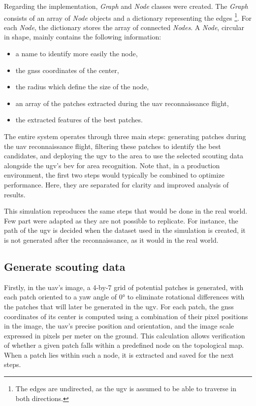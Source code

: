 Regarding the implementation, \textit{Graph} and \textit{Node} classes were created.
The \textit{Graph} consists of an array of \textit{Node} objects and a dictionary representing the edges
\footnote{The edges are undirected, as the \gls{ugv} is assumed to be able to traverse in both directions.}.
For each \textit{Node}, the dictionary stores the array of connected \textit{Nodes}.
A \textit{Node}, circular in shape, mainly contains the following information:
\begin{itemize}
    \item a name to identify more easily the node,
    \item the \gls{gnss} coordinates of the center,
    \item the radius which define the size of the node,
    \item an array of the patches extracted during the \gls{uav} reconnaissance flight,
    \item the extracted features of the best patches.
\end{itemize}

The entire system operates through three main steps: generating patches during the \gls{uav} reconnaissance flight,
filtering these patches to identify the best candidates, and deploying the \gls{ugv} to the area to use the selected
scouting data alongside the \gls{ugv}'s \gls{bev} for area recognition.
Note that, in a production environment, the first two steps would typically be combined to optimize performance.
Here, they are separated for clarity and improved analysis of results.

This simulation reproduces the same steps that would be done in the real world.
Few part were adapted as they are not possible to replicate.
For instance, the path of the \gls{ugv} is decided when the dataset used in the simulation is created, it is not generated
after the reconnaissance, as it would in the real world.

\subsection{Generate scouting data}\label{subsec:generate-scouting-data}

Firstly, in the \gls{uav}'s image, a 4-by-7 grid of potential patches is generated, with each patch oriented to a
yaw angle of 0° to eliminate rotational differences with the patches that will later be generated in the \gls{ugv}.
For each patch, the \gls{gnss} coordinates of its center is computed using a combination of their pixel positions in
the image, the \gls{uav}'s precise position and orientation, and the image scale expressed in pixels per meter on
the ground.
This calculation allows verification of whether a given patch falls within a predefined node on the topological map.
When a patch lies within such a node, it is extracted and saved for the next steps.

